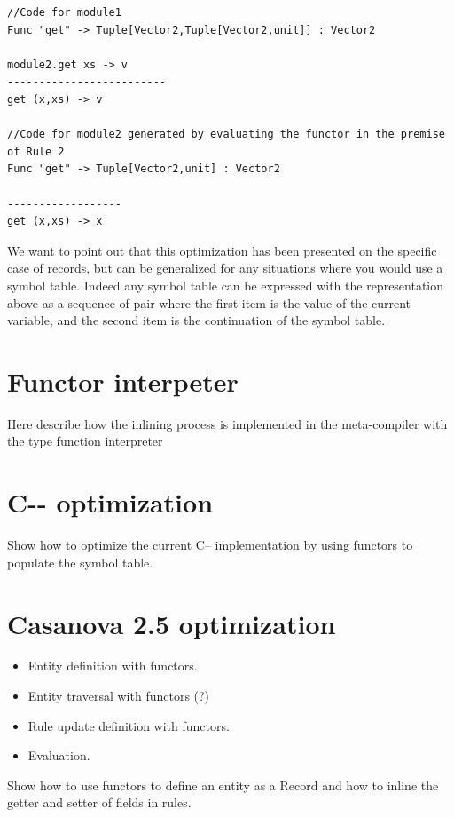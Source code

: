\begin{lstlisting}
//Code for module1
Func "get" -> Tuple[Vector2,Tuple[Vector2,unit]] : Vector2

module2.get xs -> v
-------------------------
get (x,xs) -> v

//Code for module2 generated by evaluating the functor in the premise of Rule 2
Func "get" -> Tuple[Vector2,unit] : Vector2

------------------
get (x,xs) -> x
\end{lstlisting}

We want to point out that this optimization has been presented on the specific case of records, but can be generalized for any situations where you would use a symbol table. Indeed any symbol table can be expressed with the representation above as a sequence of pair where the first item is the value of the current variable, and the second item is the continuation of the symbol table.

\section{Functor interpeter}
Here describe how the inlining process is implemented in the meta-compiler with the type function interpreter

\section{C-{}- optimization}
Show how to optimize the current C-- implementation by using functors to populate the symbol table.

\section{Casanova 2.5 optimization}
\begin{itemize}[noitemsep]
	\item Entity definition with functors.
	\item Entity traversal with functors (?)
	\item Rule update definition with functors.
	\item Evaluation.
\end{itemize}
Show how to use functors to define an entity as a Record and how to inline the getter and setter of fields in rules.

